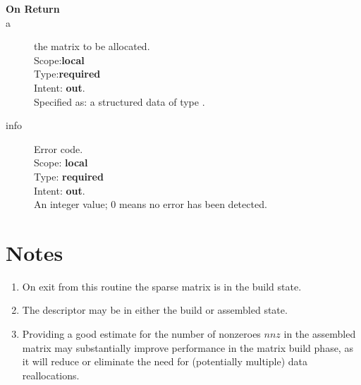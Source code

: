 \begin{description}
\item[\bf On Return]
\item[a] the matrix to be allocated.\\
Scope:{\bf local}\\
Type:{\bf required}\\
Intent: {\bf out}.\\
Specified as: a structured data of type \spdata.
\item[info] Error code.\\
Scope: {\bf local} \\
Type: {\bf required} \\
Intent: {\bf out}.\\
An integer value; 0 means no error has been detected. 
\end{description}
\section*{Notes}
\begin{enumerate}
\item On exit from this routine the sparse matrix  is in the build
  state.
\item The descriptor may be in either the build or assembled state.
\item Providing a good estimate for the number of nonzeroes $nnz$ in
  the assembled matrix may substantially improve performance in the
  matrix build phase, as it will reduce or eliminate the need for
  (potentially multiple) data reallocations. 
\end{enumerate}



%
%


